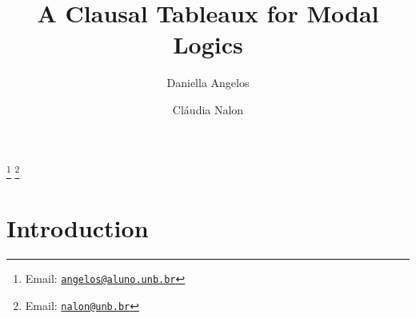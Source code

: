\documentclass{entcs}
\begin{document}


\begin{frontmatter}
    \title{A Clausal Tableaux for Modal Logics} 
    \author{Daniella Angelos}
    \address{Department of Computer Science\\ University of Bras\'ilia\\
    CEP: 70.910-090, Bras\'ilia, DF, Brazil} 
    \author{Cl\'audia Nalon}
    \address{Department of Computer Science\\ University of Bras\'ilia\\
    CEP: 70.910-090, Bras\'ilia, DF, Brazil} 
    \thanks[myemail]{Email: \href{mailto:angelos@aluno.unb.br} {\texttt{\normalshape angelos@aluno.unb.br}}} 
    \thanks[coemail]{Email: \href{mailto:nalon@unb.br} {\texttt{\normalshape nalon@unb.br}}}
\begin{abstract} 
\end{abstract}
\begin{keyword}
\end{keyword}
\end{frontmatter}
\section{Introduction}
\label{intro}










\end{document}
